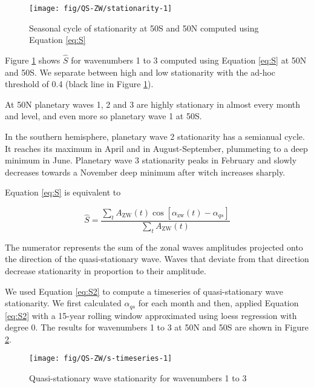 \documentclass[draft,linenumbers]{agujournal2018}
\begin{document}
\begin{figure}[h]

{\centering \texttt{[image: fig/QS-ZW/stationarity-1]} 

}

\caption{Seasonal cycle of stationarity at 50\degree S and 50\degree N computed using Equation \ref{eq:S}}\label{fig:stationarity}
\end{figure}

Figure \ref{fig:stationarity} shows \(\hat{S}\) for wavenumbers 1 to 3
computed using Equation \ref{eq:S} at 50\degree N and 50\degree S. We
separate between high and low stationarity with the ad-hoc threshold of
0.4 (black line in Figure \ref{fig:stationarity}).

At 50\degree N planetary waves 1, 2 and 3 are highly stationary in
almost every month and level, and even more so planetary wave 1 at
50\degree S.

In the southern hemisphere, planetary wave 2 stationarity has a
semianual cycle. It reaches its maximum in April and in
August-September, plummeting to a deep minimum in June. Planetary wave 3
stationarity peaks in February and slowly decreases towards a November
deep minimum after witch increases sharply.

Equation \ref{eq:S} is equivalent to

\begin{linenomath*}
\begin{equation}\label{eq:S2}
\hat{S} =   \frac{\sum_t A_\mathrm{ZW}(t) \cos  \left [\alpha_\mathrm{zw}(t) - \alpha_{qs} \right ]}{\sum_t A_\mathrm{ZW}(t)}
\end{equation}
\end{linenomath*}

The numerator represents the sum of the zonal waves amplitudes projected
onto the direction of the quasi-stationary wave. Waves that deviate from
that direction decrease stationarity in proportion to their amplitude.

We used Equation \ref{eq:S2} to compute a timeseries of quasi-stationary
wave stationarity. We first calculated \(\alpha_{qs}\) for each month
and then, applied Equation \ref{eq:S2} with a 15-year rolling window
approximated using loess regression with degree 0. The results for
wavenumbers 1 to 3 at 50\degree N and 50\degree S are shown in Figure
\ref{fig:s-timeseries}.

\begin{figure}[h]

{\centering \texttt{[image: fig/QS-ZW/s-timeseries-1]} 

}

\caption{Quasi-stationary wave stationarity for wavenumbers 1 to 3}\label{fig:s-timeseries}
\end{figure}
\end{document}
